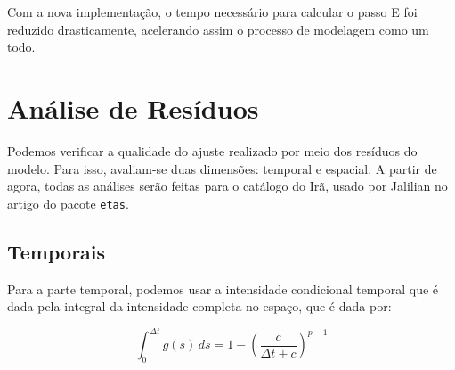 \documentclass[11pt,]{article}
\newenvironment{Shaded}{\begin{snugshade}}{\end{snugshade}}
\newcommand{\AttributeTok}[1]{\textcolor[rgb]{0.13,0.29,0.53}{#1}}
\newcommand{\CommentTok}[1]{\textcolor[rgb]{0.56,0.35,0.01}{\textit{#1}}}
\newcommand{\DecValTok}[1]{\textcolor[rgb]{0.00,0.00,0.81}{#1}}
\newcommand{\FunctionTok}[1]{\textcolor[rgb]{0.13,0.29,0.53}{\textbf{#1}}}
\newcommand{\NormalTok}[1]{#1}
\newcommand{\OtherTok}[1]{\textcolor[rgb]{0.56,0.35,0.01}{#1}}
\newcommand{\SpecialCharTok}[1]{\textcolor[rgb]{0.81,0.36,0.00}{\textbf{#1}}}
\newcommand{\StringTok}[1]{\textcolor[rgb]{0.31,0.60,0.02}{#1}}
\begin{document}
\begin{Shaded}
\end{Shaded}

Com a nova implementação, o tempo necessário para calcular o passo E foi
reduzido drasticamente, acelerando assim o processo de modelagem como um
todo.

\hypertarget{anuxe1lise-de-resuxedduos}{%
\section{Análise de Resíduos}\label{anuxe1lise-de-resuxedduos}}

Podemos verificar a qualidade do ajuste realizado por meio dos resíduos
do modelo. Para isso, avaliam-se duas dimensões: temporal e espacial. A
partir de agora, todas as análises serão feitas para o catálogo do Irã,
usado por Jalilian no artigo do pacote \texttt{etas}.

\hypertarget{temporais}{%
\subsection{Temporais}\label{temporais}}

Para a parte temporal, podemos usar a intensidade condicional temporal
que é dada pela integral da intensidade completa no espaço, que é dada
por:

\begin{equation}
\int_{0}^{\Delta t}g(s)\, ds = 1 - \left(\frac{c}{\Delta t + c}\right)^{p - 1}
\end{equation}
\end{document}
